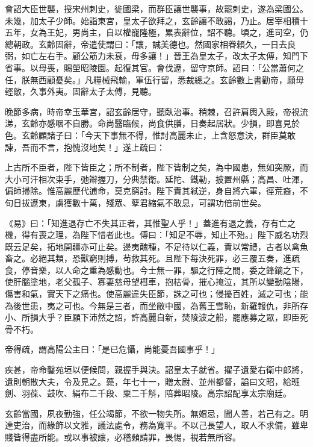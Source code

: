 \begin{pinyinscope}
 會詔大臣世襲，授宋州刺史，徙國梁，而群臣讓世襲事，故罷刺史，遂為梁國公。未幾，加太子少師。始詣東宮，皇太子欲拜之，玄齡讓不敢謁，乃止。居宰相積十五年，女為王妃，男尚主，自以權寵隆極，累表辭位，詔不聽。頃之，進司空，仍總朝政。玄齡固辭，帝遣使謂曰：「讓，誠美德也。然國家相眷賴久，一日去良弼，如亡左右手。顧公筋力未衰，毋多讓！」晉王為皇太子，改太子太傅，知門下省事。以母喪，賜塋昭陵園。起復其官。會伐遼，留守京師。詔曰：「公當蕭何之任，朕無西顧憂矣。」凡糧械飛輸，軍伍行留，悉裁總之。玄齡數上書勸帝，願毋輕敵，久事外夷。固辭太子太傅，見聽。



 晚節多病，時帝幸玉華宮，詔玄齡居守，聽臥治事。稍棘，召許肩輿入殿，帝視流涕，玄齡亦感咽不自勝。命尚醫臨候，尚食供膳，日奏起居狀。少損，即喜見於色。玄齡顧諸子曰：「今天下事無不得，惟討高麗未止，上含怒意決，群臣莫敢諫，吾而不言，抱愧沒地矣！」遂上疏曰：



 上古所不臣者，陛下皆臣之；所不制者，陛下皆制之矣，為中國患，無如突厥，而大小可汗相次束手，弛辮握刀，分典禁衛。延陀、鐵勒，披置州縣；高昌、吐渾，偏師掃除。惟高麗歷代逋命，莫克窮討。陛下責其弒逆，身自將六軍，徑荒裔，不旬日拔遼東，虜獲數十萬，殘眾、孽君縮氣不敢息，可謂功倍前世矣。



 《易》曰：「知進退存亡不失其正者，其惟聖人乎！」蓋進有退之義，存有亡之機，得有喪之理，為陛下惜者此也。傅曰：「知足不辱，知止不殆。」陛下威名功烈既云足矣，拓地開疆亦可止矣。邊夷醜種，不足待以仁義，責以常禮，古者以禽魚畜之。必絕其類，恐獸窮則搏，茍救其死。且陛下每決死罪，必三覆五奏，進疏食，停音樂，以人命之重為感動也。今士無一罪，驅之行陣之間，委之鋒鏑之下，使肝腦塗地，老父孤子、寡妻慈母望槥車，抱枯骨，摧心掩泣，其所以變動陰陽，傷害和氣，實天下之痛也。使高麗違失臣節，誅之可也；侵擾百姓，滅之可也；能為後世患，夷之可也。今無是三者，而坐敝中國，為舊王雪恥，新羅報仇，非所存小、所損大乎？臣願下沛然之詔，許高麗自新，焚陵波之船，罷應募之眾，即臣死骨不朽。



 帝得疏，謂高陽公主曰：「是已危懾，尚能憂吾國事乎！」



 疾甚，帝命鑿苑垣以便候問，親握手與決。詔皇太子就省。擢子遺愛右衛中郎將，遺則朝散大夫，令及見之。薨，年七十一，贈太尉、並州都督，謚曰文昭，給班劍、羽葆、鼓吹、絹布二千段、粟二千斛，陪葬昭陵。高宗詔配享太宗廟廷。



 玄齡當國，夙夜勤強，任公竭節，不欲一物失所。無媢忌，聞人善，若己有之。明達吏治，而緣飾以文雅，議法處令，務為寬平。不以己長望人，取人不求備，雖卑賤皆得盡所能。或以事被讓，必稽顙請罪，畏惕，視若無所容。




\end{pinyinscope}
